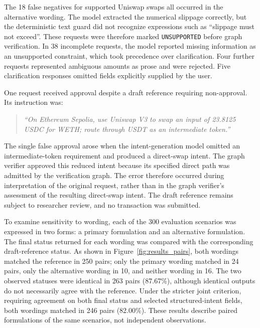 The 18 false negatives for supported Uniswap swaps all occurred in the
alternative wording. The model extracted the numerical slippage correctly,
but the deterministic text guard did not recognize expressions such as
``slippage must not exceed''. These requests were therefore marked
\texttt{UNSUPPORTED} before graph verification. In 38 incomplete requests, the model reported missing information as
an unsupported constraint, which took precedence over clarification.
Four further requests represented ambiguous amounts as prose and were
rejected. Five clarification responses omitted fields explicitly supplied
by the user.

One request received approval despite a draft reference requiring
non-approval. Its instruction was:
\begin{quote}
\emph{``On Ethereum Sepolia, use Uniswap V3 to swap an input of
23.8125 USDC for WETH; route through USDT as an intermediate token.''}
\end{quote}
The single false approval arose when the intent-generation model omitted
an intermediate-token requirement and produced a direct-swap intent.
The graph verifier approved this reduced intent because its specified
direct path was admitted by the verification graph. The error therefore
occurred during interpretation of the original request, rather than in
the graph verifier's assessment of the resulting direct-swap intent.
The draft reference remains subject to researcher review, and no
transaction was submitted.

To examine sensitivity to wording, each of the 300 evaluation scenarios
was expressed in two forms: a primary formulation and an alternative
formulation. The final status returned for each wording was compared
with the corresponding draft-reference status. As shown in
Figure~\ref{fig:results_pairs}, both wordings matched the reference in
250 pairs; only the primary wording matched in 24 pairs, only the
alternative wording in 10, and neither wording in 16. The two observed
statuses were identical in 263 pairs (87.67\%), although identical
outputs do not necessarily agree with the reference. Under the stricter
joint criterion, requiring agreement on both final status and selected
structured-intent fields, both wordings matched in 246 pairs (82.00\%).
These results describe paired formulations of the same scenarios, not
independent observations.

